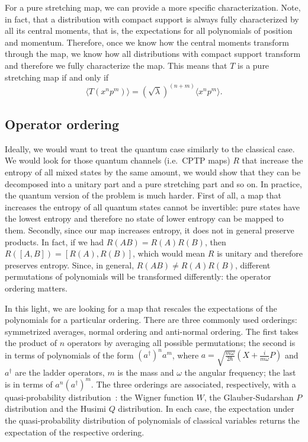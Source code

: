 \documentclass{article}
\begin{document}
For a pure stretching map, we can provide a more specific characterization. Note, in fact, that a distribution with compact support is always fully characterized by all its central moments, that is, the expectations for all polynomials of position and momentum. Therefore, once we know how the central moments transform through the map, we know how all distributions with compact support transform and therefore we fully characterize the map. This means that $T$ is a pure stretching map if and only if
\begin{equation}
    \langle T(x^np^m) \rangle = (\sqrt{\lambda})^{(n+m)} \langle x^n p^m \rangle.
\end{equation}

\subsection{Operator ordering}

Ideally, we would want to treat the quantum case similarly to the classical case. We would look for those quantum channels (i.e.~CPTP maps) $R$ that increase the entropy of all mixed states by the same amount, we would show that they can be decomposed into a unitary part and a pure stretching part and so on. In practice, the quantum version of the problem is much harder. First of all, a map that increases the entropy of all quantum states cannot be invertible: pure states have the lowest entropy and therefore no state of lower entropy can be mapped to them. Secondly, since our map increases entropy, it does not in general preserve products. In fact, if we had $R(AB) = R(A)R(B)$, then $R([A,B]) = [R(A),R(B)]$, which would mean $R$ is unitary and therefore preserves entropy. Since, in general, $R(AB) \neq R(A)R(B)$, different permutations of polynomials will be transformed differently: the operator ordering matters.

In this light, we are looking for a map that rescales the expectations of the polynomials for a particular ordering. There are three commonly used orderings: symmetrized averages, normal ordering and anti-normal ordering. The first takes the product of $n$ operators by averaging all possible permutations; the second is in terms of polynomials of the form $(a^\dagger)^n a^m$, where $a=\sqrt{\frac{m\omega}{2\hbar}}(X+\frac{i}{m\omega}P)$ and $a^\dagger$ are the ladder operators, $m$ is the mass and $\omega$ the angular frequency; the last is in terms of $a^n (a^\dagger)^m$. The three orderings are associated, respectively, with a quasi-probability distribution~\cite{carmichael2013statistical}: the Wigner function $W$, the Glauber-Sudarshan $P$ distribution and the Husimi $Q$ distribution. In each case, the expectation under the quasi-probability distribution of polynomials of classical variables returns the expectation of the respective ordering.
\end{document}
